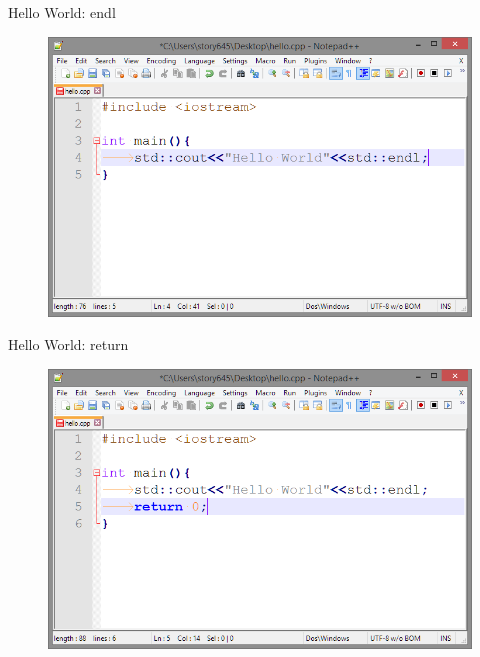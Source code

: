 \documentclass[xcolor={dvipsnames}]{beamer}
\begin{document}
\begin{frame}{Hello World: endl}
	\begin{figure}
			\includegraphics[width=1\textwidth]{endl}
	\end{figure}
\end{frame}

\begin{frame}{Hello World: return}
	\begin{figure}
			\includegraphics[width=1\textwidth]{return}
	\end{figure}
\end{frame}
\end{document}
